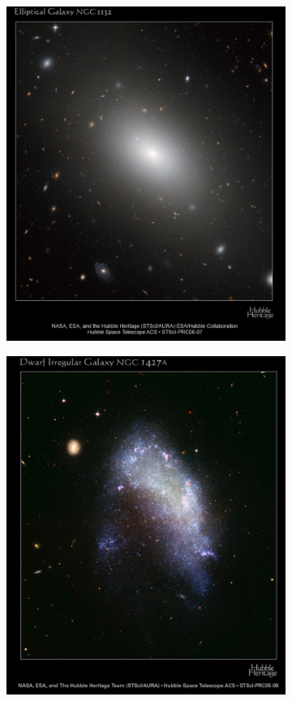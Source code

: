 \begin{figure}[H]
\begin{subfigure}[b]{0.49\textwidth}
			\includegraphics[width=1\linewidth]{img/ch-01/ellipticalNGC1132.png}
			\caption{}
			\label{fig:ellipitcalNGC1332}
		\end{subfigure}
		\begin{subfigure}[b]{0.49\textwidth}
			\includegraphics[width=1\linewidth]{img/ch-01/dwarfirregularNGC1427A.png}

\end{subfigure}
\end{figure}
